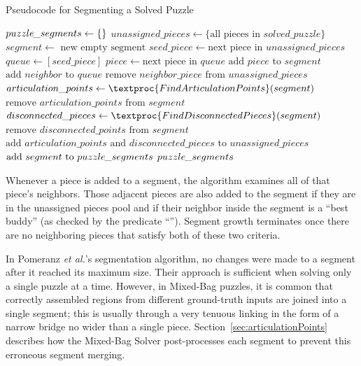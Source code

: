 \begin{algorithm}[t]
\caption{Pseudocode for Segmenting a Solved Puzzle}\label{alg:segmentPuzzle}
\begin{algorithmic}[1]
    \State $puzzle\hspace{-0.8pt}\_segments \gets \{ \}$
    \State $unassigned\_pieces \gets \{ \text{all pieces in } solved\_puzzle \}$
        \State $segment \gets \text{ new empty segment}$
        \State $seed\_piece \gets \text{next piece in } unassigned\_pieces$
        \State $queue \gets [seed\_piece]$
            \State $piece \gets \text{next piece in } queue$
            \State $\text{add } piece \text{ to } segment$
            		\State $\text{add } neighbor \text{ to } queue$
            		\State $\text{remove } neighbor\_piece \text{ from } unassigned\_pieces$
            	\EndIf
            \EndFor
        \EndWhile
        \State $articulation\_points \gets \textproc{FindArticulationPoints}(segment)$
        \State $\text{remove } articulation\_points \text{ from } \textit{segment}$
		\State $disconnected\_pieces \gets \textproc{FindDisconnectedPieces}(segment)$ 
		\State $\text{remove } disconnected\_points \text{ from } segment$
        \State $\text{add } \textit{articulation\_points} \text{ and } \textit{disconnected\_pieces} \text{ to } \textit{unassigned\_pieces}$               	
		\State $\text{add } segment \text{ to } puzzle\hspace{-0.8pt}\_segments$	
    \EndWhile
    \State \Return $puzzle\hspace{-0.8pt}\_segments$
\EndFunction
\end{algorithmic}
\end{algorithm}

Whenever a piece is added to a segment, the algorithm examines all of that piece's neighbors.  Those adjacent pieces are also added to the segment if they are in the unassigned pieces pool and if their neighbor inside the segment is a ``best buddy'' (as checked by the predicate ``'').  Segment growth terminates once there are no neighboring pieces that satisfy both of these two criteria. 

In Pomeranz \textit{et al.}'s segmentation algorithm, no changes were made to a segment after it reached its maximum size.  Their approach is sufficient when solving only a single puzzle at a time.  However, in Mixed-Bag puzzles, it is common that correctly assembled regions from different ground-truth inputs are joined into a single segment; this is usually through a very tenuous linking in the form of a narrow bridge no wider than a single piece.  Section~\ref{sec:articulationPoints} describes how the Mixed-Bag Solver post-processes each segment to prevent this erroneous segment merging.

